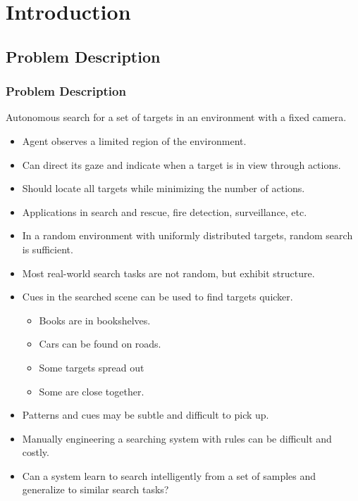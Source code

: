
\section{Introduction}

\subsection{Problem Description}

\begin{frame}
    \frametitle{Problem Description}
    
    Autonomous search for a set of targets in an environment with a fixed camera.
    
    \begin{itemize}
        \item Agent observes a limited region of the environment. 
        \item Can direct its gaze and indicate when a target is in view through actions.
        \item Should locate all targets while minimizing the number of actions.
        \item Applications in search and rescue, fire detection, surveillance, etc.
    \end{itemize}
\end{frame}

\begin{frame}
    \begin{itemize}
        \item In a random environment with uniformly distributed targets, random search is sufficient.
        \item Most real-world search tasks are not random, but exhibit structure.
        \item Cues in the searched scene can be used to find targets quicker.
        \begin{itemize}
            \item Books are in bookshelves.
            \item Cars can be found on roads.
            \item Some targets spread out
            \item Some are close together.
        \end{itemize}
        \item Patterns and cues may be subtle and difficult to pick up.
        \item Manually engineering a searching system with rules can be difficult and costly.
        \item Can a system learn to search intelligently from a set of samples and generalize to similar search tasks?
    \end{itemize}
\end{frame}


